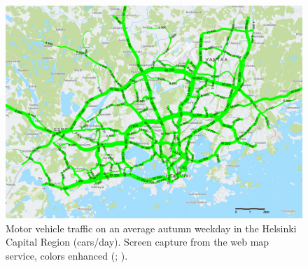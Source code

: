 \begin{figure}[H]%
    \includegraphics[width=\textwidth]{images/traffic_amount_autumn2018.png}
    \caption[Motor vehicle traffic on main roads in the Helsinki Capital Region]{Motor vehicle traffic on an average autumn weekday in the Helsinki Capital Region (cars/day). Screen capture from the web map service, colors enhanced (\cite{Helsinginseudunliikenne2019}; \cite{OpenStreetMap}).}%
    \label{fig:traffic_amount_autumn2018}%
\end{figure}

